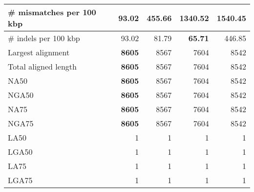 \documentclass[12pt,a4paper]{article}
\begin{document}
\begin{table}[ht]
\begin{center}
\begin{tabular}{|l*{4}{|r}|}
\# mismatches per 100 kbp & {\bf 93.02} & 455.66 & 1340.52 & 1540.45 \\ \hline
\# indels per 100 kbp & 93.02 & 81.79 & {\bf 65.71} & 446.85 \\ \hline
Largest alignment & {\bf 8605} & 8567 & 7604 & 8542 \\ \hline
Total aligned length & {\bf 8605} & 8567 & 7604 & 8542 \\ \hline
NA50 & {\bf 8605} & 8567 & 7604 & 8542 \\ \hline
NGA50 & {\bf 8605} & 8567 & 7604 & 8542 \\ \hline
NA75 & {\bf 8605} & 8567 & 7604 & 8542 \\ \hline
NGA75 & {\bf 8605} & 8567 & 7604 & 8542 \\ \hline
LA50 & 1 & 1 & 1 & 1 \\ \hline
LGA50 & 1 & 1 & 1 & 1 \\ \hline
LA75 & 1 & 1 & 1 & 1 \\ \hline
LGA75 & 1 & 1 & 1 & 1 \\ \hline
\end{tabular}
\end{center}
\end{table}
\end{document}
